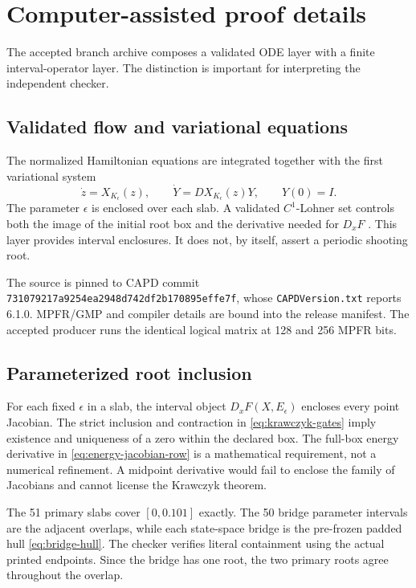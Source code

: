 \section{Computer-assisted proof details}
\label{app:cap}

The accepted branch archive composes a validated ODE layer with a finite
interval-operator layer.  The distinction is important for interpreting the
independent checker.

\subsection{Validated flow and variational equations}

The normalized Hamiltonian equations are integrated together with the first
variational system
\begin{equation}
 \dot z=X_{K_\epsilon}(z),
 \qquad
 \dot Y=DX_{K_\epsilon}(z)Y,
 \qquad Y(0)=I.
 \label{eq:variational-system}
\end{equation}
The parameter \(\epsilon\) is enclosed over each slab.  A validated
\(C^1\)-Lohner set controls both the image of the initial root box and the
derivative needed for \(D_xF\)
\citep{Lohner1987,NedialkovJacksonCorliss1999,Zgliczynski2002,
KapelaMrozekWilczakZgliczynski2021}.  This layer
provides interval enclosures.  It does not, by itself, assert a periodic
shooting root.

The source is pinned to CAPD commit
\texttt{731079217a9254ea2948d742df2b170895effe7f}, whose
\texttt{CAPDVersion.txt} reports 6.1.0.  MPFR/GMP and compiler details are
bound into the release manifest.  The accepted producer runs the identical
logical matrix at 128 and 256 MPFR bits.

\subsection{Parameterized root inclusion}

For each fixed \(\epsilon\) in a slab, the interval object
\(D_xF(X,E_\epsilon)\) encloses every point Jacobian.  The strict inclusion
and contraction in \cref{eq:krawczyk-gates} imply existence and uniqueness
of a zero within the declared box.  The full-box energy derivative in
\cref{eq:energy-jacobian-row} is a mathematical requirement, not a numerical
refinement.  A midpoint derivative would fail to enclose the family of
Jacobians and cannot license the Krawczyk theorem.

The 51 primary slabs cover \([0,0.101]\) exactly.  The 50 bridge parameter
intervals are the adjacent overlaps, while each state-space bridge is the
pre-frozen padded hull \cref{eq:bridge-hull}.  The checker verifies literal
containment using the actual printed endpoints.  Since the bridge has one
root, the two primary roots agree throughout the overlap.

